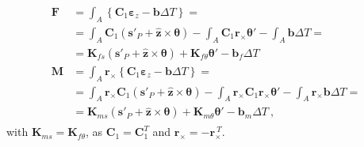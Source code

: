 \documentclass[letterpaper,10pt,english]{jupyterBook}
\begin{document}
\begin{equation*}
\begin{split}\begin{aligned}
  \mathbf{F}
  & = \int_{A} \left\{ \mathbf{C}_1 \boldsymbol\varepsilon_z - \mathbf{b} \Delta T \right\} = \\
  & = \int_{A} \mathbf{C}_1 ( \mathbf{s}'_P + \hat{\mathbf{z}} \times \boldsymbol\theta ) - \int_A \mathbf{C}_1 \mathbf{r}_{\times} \boldsymbol\theta' - \int_A \mathbf{b} \Delta T = \\
  & = \mathbf{K}_{fs} \left( \mathbf{s}'_P + \hat{\mathbf{z}} \times \boldsymbol\theta \right) + \mathbf{K}_{f\theta} \boldsymbol\theta'-\mathbf{b}_f \Delta T \\
  \mathbf{M}
  & = \int_{A} \mathbf{r}_{\times} \left\{ \mathbf{C}_1 \boldsymbol\varepsilon_z - \mathbf{b} \Delta T \right\} = \\
  & = \int_{A} \mathbf{r}_{\times} \mathbf{C}_1 ( \mathbf{s}'_P + \hat{\mathbf{z}} \times \boldsymbol\theta ) - \int_A \mathbf{r}_{\times} \mathbf{C}_1 \mathbf{r}_{\times} \boldsymbol\theta' - \int_A \mathbf{r}_{\times} \mathbf{b} \Delta T = \\
  & = \mathbf{K}_{ms} \left( \mathbf{s}'_P + \hat{\mathbf{z}} \times \boldsymbol\theta \right) + \mathbf{K}_{m\theta} \boldsymbol\theta'- \mathbf{b}_m \Delta T \ ,
\end{aligned}\end{split}
\end{equation*}
\sphinxAtStartPar
with \(\mathbf{K}_{ms} = \mathbf{K}_{f\theta}\), as \(\mathbf{C}_1 = \mathbf{C}_1^T\) and \(\mathbf{r}_{\times} = - \mathbf{r}_{\times}^{\ T}\).
\end{document}
